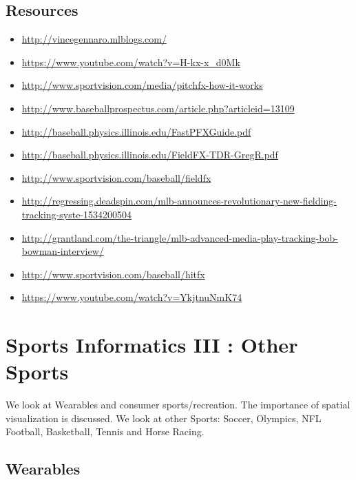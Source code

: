 
\subsection{Resources}\label{resources-1}

\begin{itemize}
\item
  \url{http://vincegennaro.mlblogs.com/}
\item
  \url{https://www.youtube.com/watch?v=H-kx-x_d0Mk}
\item
  \url{http://www.sportvision.com/media/pitchfx-how-it-works}
\item
  \url{http://www.baseballprospectus.com/article.php?articleid=13109}
\item
  \url{http://baseball.physics.illinois.edu/FastPFXGuide.pdf}
\item
  \url{http://baseball.physics.illinois.edu/FieldFX-TDR-GregR.pdf}
\item
  \url{http://www.sportvision.com/baseball/fieldfx}
\item
  \url{http://regressing.deadspin.com/mlb-announces-revolutionary-new-fielding-tracking-syste-1534200504}
\item
  \url{http://grantland.com/the-triangle/mlb-advanced-media-play-tracking-bob-bowman-interview/}
\item
  \url{http://www.sportvision.com/baseball/hitfx}
\item
  \url{https://www.youtube.com/watch?v=YkjtnuNmK74}
\end{itemize}

\section{Sports Informatics III : Other
Sports}\label{sports-informatics-iii-other-sports}

We look at Wearables and consumer sports/recreation. The importance of
spatial visualization is discussed. We look at other Sports: Soccer,
Olympics, NFL Football, Basketball, Tennis and Horse Racing.




\subsection{Wearables}\label{wearables}

